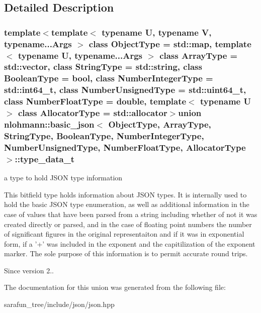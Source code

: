 \begin{DoxyCompactItemize}
{{\begin{tabbing}
{{{{{\end{tabbing}\end{DoxyCompactItemize}


\subsection{Detailed Description}
\subsubsection*{template$<$template$<$ typename U, typename V, typename...\-Args $>$ class Object\-Type = std\-::map, template$<$ typename U, typename...\-Args $>$ class Array\-Type = std\-::vector, class String\-Type = std\-::string, class Boolean\-Type = bool, class Number\-Integer\-Type = std\-::int64\-\_\-t, class Number\-Unsigned\-Type = std\-::uint64\-\_\-t, class Number\-Float\-Type = double, template$<$ typename U $>$ class Allocator\-Type = std\-::allocator$>$union nlohmann\-::basic\-\_\-json$<$ Object\-Type, Array\-Type, String\-Type, Boolean\-Type, Number\-Integer\-Type, Number\-Unsigned\-Type, Number\-Float\-Type, Allocator\-Type $>$\-::type\-\_\-data\-\_\-t}

a type to hold J\-S\-O\-N type information 

This bitfield type holds information about J\-S\-O\-N types. It is internally used to hold the basic J\-S\-O\-N type enumeration, as well as additional information in the case of values that have been parsed from a string including whether of not it was created directly or parsed, and in the case of floating point numbers the number of significant figures in the original representaiton and if it was in exponential form, if a '+' was included in the exponent and the capitilization of the exponent marker. The sole purpose of this information is to permit accurate round trips.

\begin{DoxySince}{Since}
version 2.. 
\end{DoxySince}


The documentation for this union was generated from the following file\-:\begin{DoxyCompactItemize}
\item 
sarafun\-\_\-tree/include/json/json.\-hpp\end{DoxyCompactItemize}
